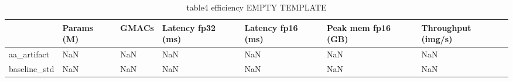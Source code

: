 \begin{table}
\caption{table4 efficiency EMPTY TEMPLATE}
\label{tab:table4_efficiency_EMPTY_TEMPLATE}
\begin{tabular}{lllllll}
\toprule
 & Params (M) & GMACs & Latency fp32 (ms) & Latency fp16 (ms) & Peak mem fp16 (GB) & Throughput (img/s) \\
\midrule
aa\_artifact & NaN & NaN & NaN & NaN & NaN & NaN \\
baseline\_std & NaN & NaN & NaN & NaN & NaN & NaN \\
\bottomrule
\end{tabular}
\end{table}

